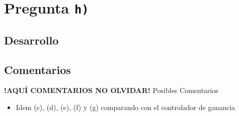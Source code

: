 \section{Pregunta \texttt{h)}}\label{pregunta-h}


\subsection{Desarrollo}

\FloatBarrier
\subsection{Comentarios}


\textbf{!AQUÍ COMENTARIOS NO OLVIDAR!}
Posibles Comentarios
\begin{itemize}
    \item Idem (c), (d), (e), (f) y (g) comparando con el controlador de ganancia
\end{itemize}